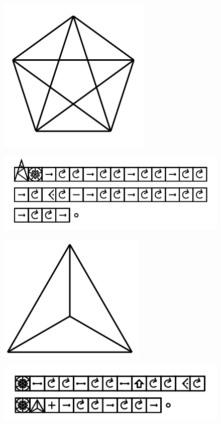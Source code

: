 \documentclass[11pt]{article}
\begin{document}
\begin{figure}
\includegraphics[scale=0.3]{image17.png}
\end{figure}
\begin{figure}
\includegraphics[scale=0.3]{image18.png}
\end{figure}

\begin{figure}
\includegraphics[scale=0.3]{image19.png}
\end{figure}
\begin{figure}
\includegraphics[scale=0.3]{image20.png}
\end{figure}
\end{document}
